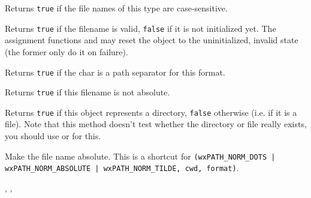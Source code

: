 Returns {\tt true} if the file names of this type are case-sensitive.

\label{wxfilenameisok}


Returns {\tt true} if the filename is valid, {\tt false} if it is not
initialized yet. The assignment functions and
 may reset the object to the uninitialized,
invalid state (the former only do it on failure).

\label{wxfilenameispathseparator}


Returns {\tt true} if the char is a path separator for this format.

\label{wxfilenameisrelative}


Returns {\tt true} if this filename is not absolute.

\label{wxfilenameisdir}


Returns {\tt true} if this object represents a directory, {\tt false} otherwise
(i.e. if it is a file). Note that this method doesn't test whether the
directory or file really exists, you should use 
 or 
 for this.

\label{wxfilenamemakeabsolute}


Make the file name absolute. This is a shortcut for
{\tt {}(wxPATH\_NORM\_DOTS | wxPATH\_NORM\_ABSOLUTE | wxPATH\_NORM\_TILDE, cwd, format)}.


,
,

\label{wxfilenamemakerelativeto}


